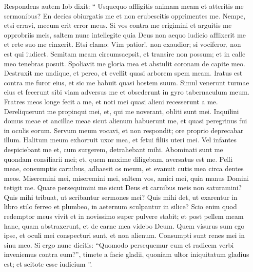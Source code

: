 \begin{biblechapter}
\begin{biblechapter}
\begin{biblechapter}
\begin{biblechapter}
\begin{biblechapter}
\begin{biblechapter}
\begin{biblechapter}
\begin{biblechapter}
\begin{biblechapter}
\begin{biblechapter}
\begin{biblechapter}
\begin{biblechapter}
\begin{biblechapter}
\begin{biblechapter}
\begin{biblechapter}
\begin{biblechapter}
\begin{biblechapter}
\begin{biblechapter}
\begin{biblechapter}
\verse Respondens autem Iob dixit:
 \verse “ Usquequo affligitis animam meam
 et atteritis me sermonibus?
 \verse En decies obiurgatis me
 et non erubescitis opprimentes me.
 \verse Nempe, etsi erravi,
 mecum erit error meus.
 \verse Si vos contra me erigimini
 et arguitis me opprobriis meis,
 \verse saltem nunc intellegite quia Deus non aequo iudicio afflixerit me
 et rete suo me cinxerit.
 \verse Etsi clamo: Vim patior!, non exaudior;
 si vociferor, non est qui iudicet.
 \verse Semitam meam circumsaepsit, et transire non possum;
 et in calle meo tenebras posuit.
 \verse Spoliavit me gloria mea
 et abstulit coronam de capite meo.
 \verse Destruxit me undique, et pereo,
 et evellit quasi arborem spem meam.
 \verse Iratus est contra me furor eius,
 et sic me habuit quasi hostem suum.
 \verse Simul venerunt turmae eius
 et fecerunt sibi viam adversus me
 et obsederunt in gyro tabernaculum meum.
 \verse Fratres meos longe fecit a me,
 et noti mei quasi alieni recesserunt a me.
 \verse Dereliquerunt me propinqui mei,
 et, qui me noverant, obliti sunt mei.
 \verse Inquilini domus meae et ancillae meae sicut alienum habuerunt me,
 et quasi peregrinus fui in oculis eorum.
 \verse Servum meum vocavi, et non respondit;
 ore proprio deprecabar illum.
 \verse Halitum meum exhorruit uxor mea,
 et fetui filiis uteri mei.
 \verse Vel infantes despiciebant me
 et, cum surgerem, detrahebant mihi.
 \verse Abominati sunt me quondam consiliarii mei;
 et, quem maxime diligebam, aversatus est me.
 \verse Pelli meae, consumptis carnibus, adhaesit os meum,
 et evanuit cutis mea circa dentes meos.
 \verse Miseremini mei, miseremini mei, saltem vos, amici mei,
 quia manus Domini tetigit me.
 \verse Quare persequimini me sicut Deus
 et carnibus meis non saturamini?
 \verse Quis mihi tribuat, ut scribantur sermones mei?
 Quis mihi det, ut exarentur in libro
 \verse stilo ferreo et plumbeo,
 in aeternum sculpantur in silice?
 \verse Scio enim quod redemptor meus vivit
 et in novissimo super pulvere stabit;
 \verse et post pellem meam hanc, quam abstraxerunt,
 et de carne mea videbo Deum.
 \verse Quem visurus sum ego ipse,
 et oculi mei conspecturi sunt, et non alienum.
 Consumpti sunt renes mei in sinu meo.
 \verse Si ergo nunc dicitis: “Quomodo persequemur eum
 et radicem verbi inveniemus contra eum?”,
 \verse timete a facie gladii,
 quoniam ultor iniquitatum gladius est;
 et scitote esse iudicium ”.
 

\end{biblechapter}
\end{biblechapter}
\end{biblechapter}
\end{biblechapter}
\end{biblechapter}
\end{biblechapter}
\end{biblechapter}
\end{biblechapter}
\end{biblechapter}
\end{biblechapter}
\end{biblechapter}
\end{biblechapter}
\end{biblechapter}
\end{biblechapter}
\end{biblechapter}
\end{biblechapter}
\end{biblechapter}
\end{biblechapter}
\end{biblechapter}
